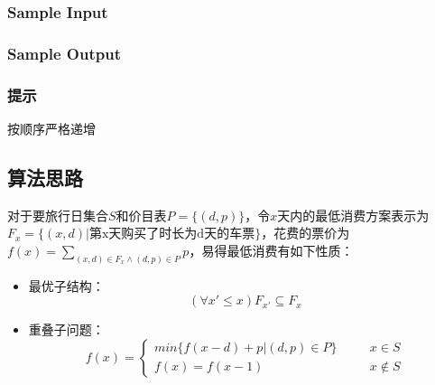 \subsubsection*{Sample Input}








\subsubsection*{Sample Output}



\subsubsection*{提示}



按顺序严格递增



\subsection{算法思路}

对于要旅行日集合$S$和价目表$P=\{(d,p)\}$，令$x$天内的最低消费方案表示为$F_x=\{(x,d)|\text{第x天购买了时长为d天的车票}\}$，花费的票价为$f(x)=\sum_{(x,d)\in F_x\wedge (d,p)\in P}p$，易得最低消费有如下性质：

\begin{itemize}
    \item 最优子结构：$$(\forall x'\leq x)F_{x'}\subseteq F_x$$
    \item 重叠子问题：$$f(x)=\left\{\begin{aligned}
        min\{f(x-d)+p|(d,p)\in P\}&\quad&x\in S\\
        f(x)=f(x-1)&\quad&x\notin S
    \end{aligned}\right.$$
\end{itemize}


